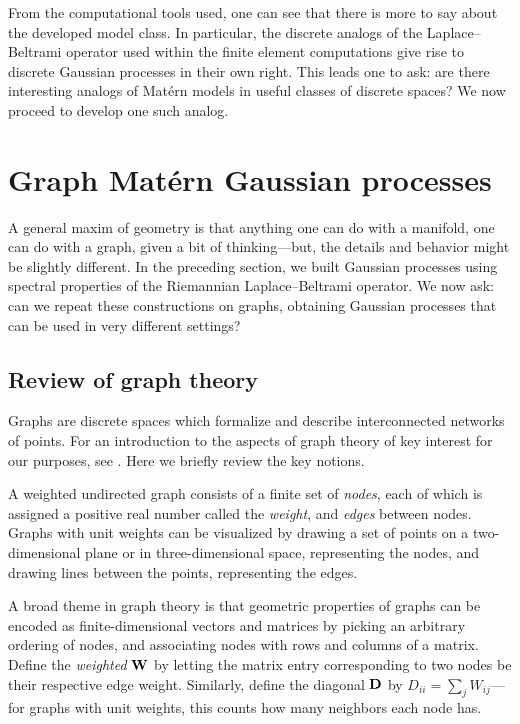 \documentclass[11pt]{book}
\begin{document}
From the computational tools used, one can see that there is more to say about the developed model class.
In particular, the discrete analogs of the Laplace--Beltrami operator used within the finite element computations give rise to discrete Gaussian processes in their own right.
This leads one to ask: are there interesting analogs of Matérn models in useful classes of discrete spaces?
We now proceed to develop one such analog.

\section{Graph Matérn Gaussian processes}

A general maxim of geometry is that anything one can do with a manifold, one can do with a graph, given a bit of thinking---but, the details and behavior might be slightly different.
In the preceding section, we built Gaussian processes using spectral properties of the Riemannian Laplace--Beltrami operator.
We now ask: can we repeat these constructions on graphs, obtaining Gaussian processes that can be used in very different settings?

\subsection{Review of graph theory}
Graphs are discrete spaces which formalize and describe interconnected networks of points.
For an introduction to the aspects of graph theory of key interest for our purposes, see \textcite{spielman12}.
Here we briefly review the key notions.

A weighted undirected graph consists of a finite set of \emph{nodes}, each of which is assigned a positive real number called the \emph{weight}, and \emph{edges} between nodes.
Graphs with unit weights can be visualized by drawing a set of points on a two-dimensional plane or in three-dimensional space, representing the nodes, and drawing lines between the points, representing the edges.

A broad theme in graph theory is that geometric properties of graphs can be encoded as finite-dimensional vectors and matrices by picking an arbitrary ordering of nodes, and associating nodes with rows and columns of a matrix.
Define the \emph{weighted } $\m{W}$ by letting the matrix entry corresponding to two nodes be their respective edge weight.
Similarly, define the diagonal  $\m{D}$ by $D_{ii} = \sum_j W_{ij}$---for graphs with unit weights, this counts how many neighbors each node has.
\end{document}
